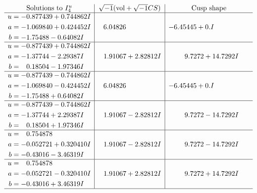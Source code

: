 \documentclass[1p]{elsarticle_modified}
\theoremstyle{definition}
\newcommand{\I}{\sqrt{-1}}
\begin{document}
$$\begin{array}{c|c|c}  
\text{Solutions to }I^u_{4}& \I (\text{vol} + \sqrt{-1}CS) & \text{Cusp shape}\\
 \hline 
\begin{aligned}
u &= -0.877439 + 0.744862 I \\
a &= -1.069840 + 0.424452 I \\
b &= -1.75488 - 0.64082 I\end{aligned}
 & \phantom{-}6.04826\phantom{ +0.000000I} & -6.45445 + 0. I\phantom{ +0.000000I} \\ \hline\begin{aligned}
u &= -0.877439 + 0.744862 I \\
a &= -1.37744 - 2.29387 I \\
b &= \phantom{-}0.18504 - 1.97346 I\end{aligned}
 & \phantom{-}1.91067 + 2.82812 I & \phantom{-}9.7272 + 14.7292 I \\ \hline\begin{aligned}
u &= -0.877439 - 0.744862 I \\
a &= -1.069840 - 0.424452 I \\
b &= -1.75488 + 0.64082 I\end{aligned}
 & \phantom{-}6.04826\phantom{ +0.000000I} & -6.45445 + 0. I\phantom{ +0.000000I} \\ \hline\begin{aligned}
u &= -0.877439 - 0.744862 I \\
a &= -1.37744 + 2.29387 I \\
b &= \phantom{-}0.18504 + 1.97346 I\end{aligned}
 & \phantom{-}1.91067 - 2.82812 I & \phantom{-}9.7272 - 14.7292 I \\ \hline\begin{aligned}
u &= \phantom{-}0.754878\phantom{ +0.000000I} \\
a &= -0.052721 + 0.320410 I \\
b &= -0.43016 - 3.46319 I\end{aligned}
 & \phantom{-}1.91067 - 2.82812 I & \phantom{-}9.7272 - 14.7292 I \\ \hline\begin{aligned}
u &= \phantom{-}0.754878\phantom{ +0.000000I} \\
a &= -0.052721 - 0.320410 I \\
b &= -0.43016 + 3.46319 I\end{aligned}
 & \phantom{-}1.91067 + 2.82812 I & \phantom{-}9.7272 + 14.7292 I\\
 \hline 
 \end{array}$$\newpage\newpage\renewcommand{\arraystretch}{1}
\end{document}
